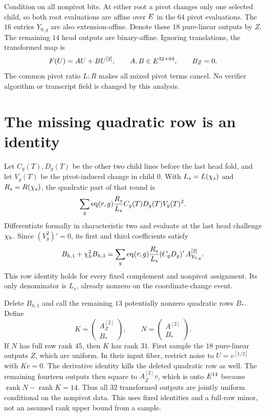 \documentclass[11pt]{article}
\begin{document}
Condition on all nonpivot bits. At either root a pivot changes only one selected child, so both root evaluations are affine over $E$ in the $64$ pivot evaluations. The $16$ entries $Y_{0,g}$ are also extension-affine. Denote these $18$ pure-linear outputs by $Z$. The remaining $14$ head outputs are binary-affine. Ignoring translations, the transformed map is
\[
 F(U)=AU+BU^{[2]},\qquad A,B\in E^{32\times64},
 \qquad B_Z=0.
\]
The common pivot ratio $L:R$ makes all mixed pivot terms cancel. No verifier algorithm or transcript field is changed by this analysis.

\section{The missing quadratic row is an identity}

Let $C_g(T),D_g(T)$ be the other two child lines before the last head fold, and let $V_g(T)$ be the pivot-induced change in child $0$. With $L_s=L(\chi_s)$ and $R_s=R(\chi_s)$, the quadratic part of that round is
\[
 \sum_g\operatorname{eq}(r,g)\frac{R_s}{L_s}C_g(T)D_g(T)V_g(T)^2.
\]
Differentiate formally in characteristic two and evaluate at the last head challenge $\chi_h$. Since $(V_g^2)'=0$, its first and third coefficients satisfy
\[
 B_{h,1}+\chi_h^2 B_{h,3}
 =\sum_g\operatorname{eq}(r,g)\frac{R_s}{L_s}(C_gD_g)'\,A_{Y_{0,g}}^{[2]}.
\]
This row identity holds for every fixed complement and nonpivot assignment. Its only denominator is $L_s$, already nonzero on the coordinate-change event.

Delete $B_{h,1}$ and call the remaining $13$ potentially nonzero quadratic rows $B_*$. Define
\[
 K=\begin{pmatrix}A_Z^{[2]}\\B_*\end{pmatrix},
 \qquad
 N=\begin{pmatrix}A^{[2]}\\B_*\end{pmatrix}.
\]
If $N$ has full row rank $45$, then $K$ has rank $31$. First sample the $18$ pure-linear outputs $Z$, which are uniform. In their input fiber, restrict noise to $U=v^{[1/2]}$ with $Kv=0$. The derivative identity kills the deleted quadratic row as well. The remaining fourteen outputs then square to $A_{\overline Z}^{[2]}v$, which is onto $E^{14}$ because $\operatorname{rank}N-\operatorname{rank}K=14$. Thus all $32$ transformed outputs are jointly uniform conditional on the nonpivot data. This uses fixed identities and a full-row minor, not an assumed rank upper bound from a sample.
\end{document}
